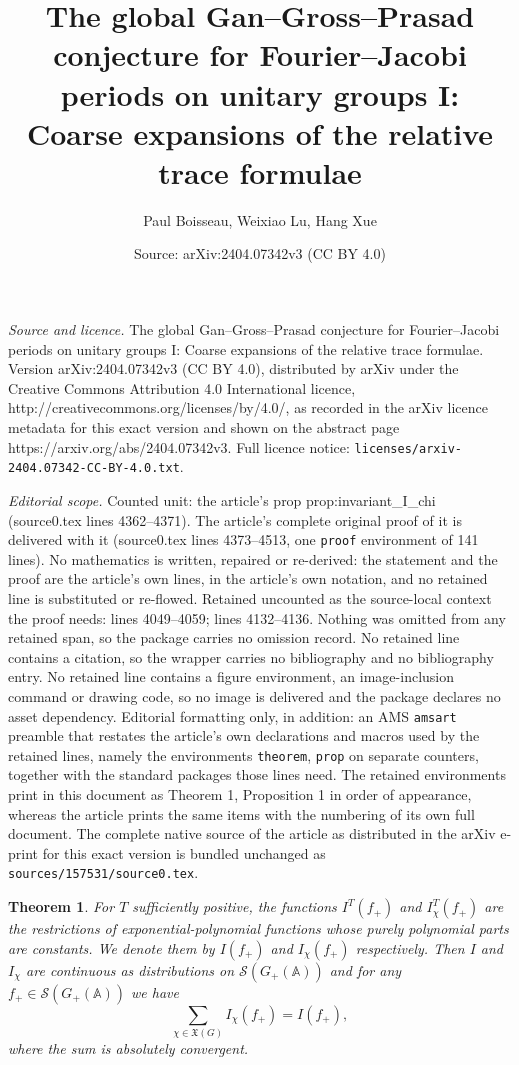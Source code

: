 \documentclass[10pt,a4paper]{amsart}
\title{The global Gan--Gross--Prasad conjecture for Fourier--Jacobi periods on unitary groups I: Coarse expansions of the relative trace formulae}
\author{Paul Boisseau, Weixiao Lu, Hang Xue}
\date{Source: arXiv:2404.07342v3 (CC BY 4.0)}
\newtheorem{theorem}{Theorem}
\newcommand{\bA}{\mathbb{A}}
\newcommand{\cS}{\mathcal{S}}
\newcommand{\fX}{\mathfrak{X}}
\begin{document}
\maketitle

\noindent\emph{Source and licence.} The global Gan--Gross--Prasad conjecture for Fourier--Jacobi periods on unitary groups I: Coarse expansions of the relative trace formulae. Version arXiv:2404.07342v3 (CC BY 4.0), distributed by arXiv under the Creative Commons Attribution 4.0 International licence, http://creativecommons.org/licenses/by/4.0/, as recorded in the arXiv licence metadata for this exact version and shown on the abstract page https://arxiv.org/abs/2404.07342v3. Full licence notice: \texttt{licenses/arxiv-2404.07342-CC-BY-4.0.txt}.\par\smallskip

\noindent\textit{Editorial scope.} Counted unit: the article's prop prop:invariant\_I\_chi (source0.tex lines 4362--4371). The article's complete original proof of it is delivered with it (source0.tex lines 4373--4513, one \texttt{proof} environment of 141 lines). No mathematics is written, repaired or re-derived: the statement and the proof are the article's own lines, in the article's own notation, and no retained line is substituted or re-flowed.  Retained uncounted as the source-local context the proof needs: lines 4049--4059; lines 4132--4136.  Nothing was omitted from any retained span, so the package carries no omission record.  No retained line contains a citation, so the wrapper carries no bibliography and no bibliography entry.  No retained line contains a figure environment, an image-inclusion command or drawing code, so no image is delivered and the package declares no asset dependency.  Editorial formatting only, in addition: an AMS \texttt{amsart} preamble that restates the article's own declarations and macros used by the retained lines, namely the environments \texttt{theorem}, \texttt{prop} on separate counters, together with the standard packages those lines need.  The retained environments print in this document as Theorem 1, Proposition 1 in order of appearance, whereas the article prints the same items with the numbering of its own full document.  The complete native source of the article as distributed in the arXiv e-print for this exact version is bundled unchanged as \texttt{sources/157531/source0.tex}.
\begin{theorem} \label{thm:coarse_spectral_expansion_GL}
For $T$ sufficiently positive, the functions $I^T(f_+)$ and $I_{\chi}^T(f_+)$ are the
restrictions of exponential-polynomial functions whose purely polynomial parts
are constants. We denote them by $I(f_+)$ and $I_{\chi}(f_+)$ respectively.
Then $I$ and $I_\chi$ are continuous as distributions on $\cS(G_+(\bA))$
and for any $f_+ \in \cS(G_+(\bA))$ we have
    \[
    \sum_{\chi \in \fX(G)} I_{\chi}(f_+) = I(f_+),
    \]
where the sum is absolutely convergent.
\end{theorem}
\end{document}
